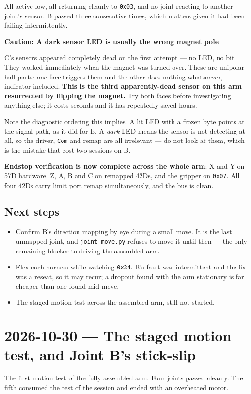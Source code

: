 \documentclass[11pt,letterpaper]{article}
\newenvironment{caution}[1]{%
    \par\addvspace{8pt}%
    \noindent{\color{cautionred}\rule{\linewidth}{0.8pt}}\par\vspace{2pt}
    \noindent\textbf{\color{cautionred}Caution: #1}\par\vspace{2pt}
}{%
    \par\vspace{2pt}\noindent{\color{cautionred}\rule{\linewidth}{0.4pt}}%
    \par\addvspace{8pt}%
}
\begin{document}
All active low, all returning cleanly to \texttt{0x03}, and no joint reacting to
another joint's sensor. B passed three consecutive times, which matters given it
had been failing intermittently.

\begin{caution}{A dark sensor LED is usually the wrong magnet pole}
C's sensors appeared completely dead on the first attempt --- no LED, no bit.
They worked immediately when the magnet was turned over. These are unipolar hall
parts: one face triggers them and the other does nothing whatsoever, indicator
included. \textbf{This is the third apparently-dead sensor on this arm resurrected
by flipping the magnet.} Try both faces before investigating anything else; it
costs seconds and it has repeatedly saved hours.

Note the diagnostic ordering this implies. A lit LED with a frozen byte points at
the signal path, as it did for B. A \emph{dark} LED means the sensor is not
detecting at all, so the driver, \texttt{Com} and remap are all irrelevant --- do
not look at them, which is the mistake that cost two sessions on B.
\end{caution}

\textbf{Endstop verification is now complete across the whole arm}: X and Y on
57D hardware, Z, A, B and C on remapped 42Ds, and the gripper on \texttt{0x07}.
All four 42Ds carry limit port remap simultaneously, and the bus is clean.

\subsection{Next steps}
\begin{itemize}
    \item Confirm B's direction mapping by eye during a small move. It is the
    last unmapped joint, and \texttt{joint\_move.py} refuses to move it until
    then --- the only remaining blocker to driving the assembled arm.
    \item Flex each harness while watching \texttt{0x34}. B's fault was
    intermittent and the fix was a reseat, so it may recur; a dropout found with
    the arm stationary is far cheaper than one found mid-move.
    \item The staged motion test across the assembled arm, still not started.
\end{itemize}

\section{2026-10-30 --- The staged motion test, and Joint B's stick-slip}
\label{sec:session-2026-10-30-motion}
The first motion test of the fully assembled arm. Four joints passed cleanly.
The fifth consumed the rest of the session and ended with an overheated motor.
\end{document}
